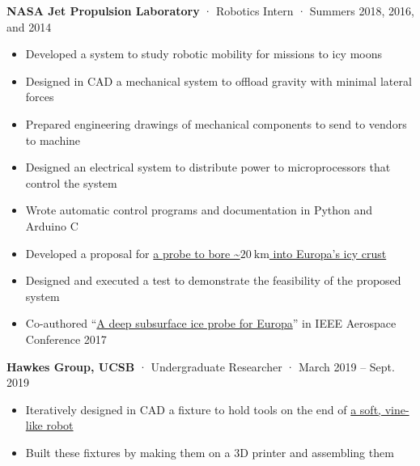 \documentclass[12pt, oneside]{article}
\newcommand{\jobtitle}[3] {
	{\bf #1} · {#2} · {#3} \vspace{-7pt} \\
}
\begin{document}
\begin{flushleft}
\jobtitle{NASA Jet Propulsion Laboratory}{Robotics Intern}{Summers 2018, 2016, and 2014}
\begin{itemize}
	\item Developed a system to study robotic mobility for missions to icy moons \\
	\item Designed in CAD a mechanical system to offload gravity with minimal lateral forces \\
	\item Prepared engineering drawings of mechanical components to send to vendors to machine \\
	\item Designed an electrical system to distribute power to microprocessors that control the system \\
	\item Wrote automatic control programs and documentation in Python and Arduino C \\
	\item Developed a proposal for \href{https://portfolium.com/entry/owms-deep-subsurface-access-level-wind}{a probe to bore \textasciitilde$\SI{20}{\kilo\meter}$ into Europa's icy crust} \\
	\item Designed and executed a test to demonstrate the feasibility of the proposed system \\
	\item Co-authored ``\href{https://www.researchgate.net/publication/317702124_A_deep_subsurface_ice_probe_for_Europa}{A deep subsurface ice probe for Europa}'' in IEEE Aerospace Conference 2017 \\
\end{itemize}

\jobtitle{Hawkes Group, UCSB}{Undergraduate Researcher}{March 2019 – Sept. 2019}
\begin{itemize}
	\item Iteratively designed in CAD a fixture to hold tools on the end of \href{https://portfolium.com/entry/vine-robot-tool-mount}{a soft, vine-like robot} \\
	\item Built these fixtures by making them on a 3D printer and assembling them \\
\end{itemize}


\end{flushleft}
\end{document}
